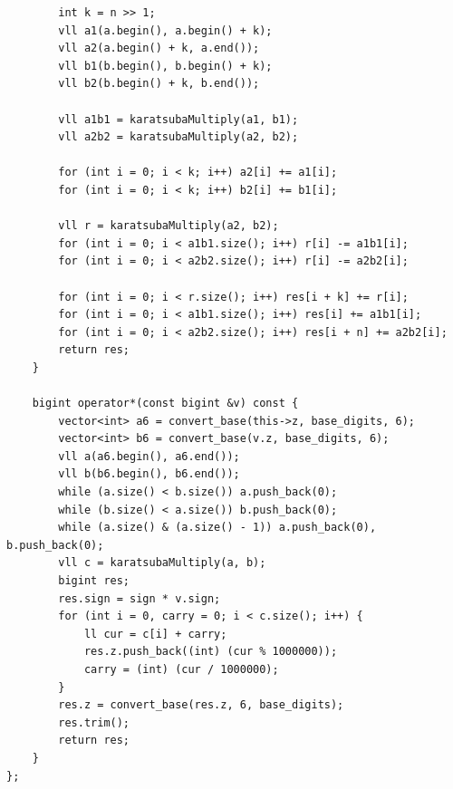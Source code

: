 \documentclass[twoside]{article}
\begin{document}
\begin{lstlisting}
        int k = n >> 1;
        vll a1(a.begin(), a.begin() + k);
        vll a2(a.begin() + k, a.end());
        vll b1(b.begin(), b.begin() + k);
        vll b2(b.begin() + k, b.end());

        vll a1b1 = karatsubaMultiply(a1, b1);
        vll a2b2 = karatsubaMultiply(a2, b2);

        for (int i = 0; i < k; i++) a2[i] += a1[i];
        for (int i = 0; i < k; i++) b2[i] += b1[i];

        vll r = karatsubaMultiply(a2, b2);
        for (int i = 0; i < a1b1.size(); i++) r[i] -= a1b1[i];
        for (int i = 0; i < a2b2.size(); i++) r[i] -= a2b2[i];

        for (int i = 0; i < r.size(); i++) res[i + k] += r[i];
        for (int i = 0; i < a1b1.size(); i++) res[i] += a1b1[i];
        for (int i = 0; i < a2b2.size(); i++) res[i + n] += a2b2[i];
        return res;
    }

    bigint operator*(const bigint &v) const {
        vector<int> a6 = convert_base(this->z, base_digits, 6);
        vector<int> b6 = convert_base(v.z, base_digits, 6);
        vll a(a6.begin(), a6.end());
        vll b(b6.begin(), b6.end());
        while (a.size() < b.size()) a.push_back(0);
        while (b.size() < a.size()) b.push_back(0);
        while (a.size() & (a.size() - 1)) a.push_back(0), b.push_back(0);
        vll c = karatsubaMultiply(a, b);
        bigint res;
        res.sign = sign * v.sign;
        for (int i = 0, carry = 0; i < c.size(); i++) {
            ll cur = c[i] + carry;
            res.z.push_back((int) (cur % 1000000));
            carry = (int) (cur / 1000000);
        }
        res.z = convert_base(res.z, 6, base_digits);
        res.trim();
        return res;
    }
};
\end{lstlisting}
\end{document}
